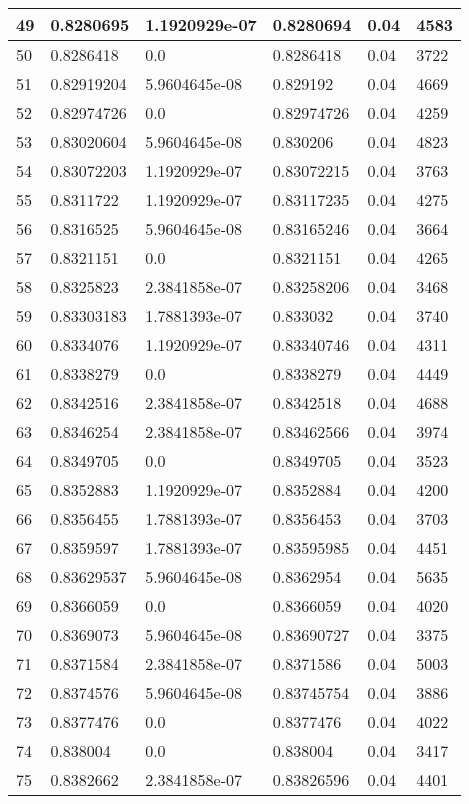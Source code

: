 \begin{longtable}{|l|l|l|l|l|l|}
49 & 0.8280695 & 1.1920929e-07 & 0.8280694 & 0.04 & 4583 \\ \hline 
50 & 0.8286418 & 0.0 & 0.8286418 & 0.04 & 3722 \\ \hline 
51 & 0.82919204 & 5.9604645e-08 & 0.829192 & 0.04 & 4669 \\ \hline 
52 & 0.82974726 & 0.0 & 0.82974726 & 0.04 & 4259 \\ \hline 
53 & 0.83020604 & 5.9604645e-08 & 0.830206 & 0.04 & 4823 \\ \hline 
54 & 0.83072203 & 1.1920929e-07 & 0.83072215 & 0.04 & 3763 \\ \hline 
55 & 0.8311722 & 1.1920929e-07 & 0.83117235 & 0.04 & 4275 \\ \hline 
56 & 0.8316525 & 5.9604645e-08 & 0.83165246 & 0.04 & 3664 \\ \hline 
57 & 0.8321151 & 0.0 & 0.8321151 & 0.04 & 4265 \\ \hline 
58 & 0.8325823 & 2.3841858e-07 & 0.83258206 & 0.04 & 3468 \\ \hline 
59 & 0.83303183 & 1.7881393e-07 & 0.833032 & 0.04 & 3740 \\ \hline 
60 & 0.8334076 & 1.1920929e-07 & 0.83340746 & 0.04 & 4311 \\ \hline 
61 & 0.8338279 & 0.0 & 0.8338279 & 0.04 & 4449 \\ \hline 
62 & 0.8342516 & 2.3841858e-07 & 0.8342518 & 0.04 & 4688 \\ \hline 
63 & 0.8346254 & 2.3841858e-07 & 0.83462566 & 0.04 & 3974 \\ \hline 
64 & 0.8349705 & 0.0 & 0.8349705 & 0.04 & 3523 \\ \hline 
65 & 0.8352883 & 1.1920929e-07 & 0.8352884 & 0.04 & 4200 \\ \hline 
66 & 0.8356455 & 1.7881393e-07 & 0.8356453 & 0.04 & 3703 \\ \hline 
67 & 0.8359597 & 1.7881393e-07 & 0.83595985 & 0.04 & 4451 \\ \hline 
68 & 0.83629537 & 5.9604645e-08 & 0.8362954 & 0.04 & 5635 \\ \hline 
69 & 0.8366059 & 0.0 & 0.8366059 & 0.04 & 4020 \\ \hline 
70 & 0.8369073 & 5.9604645e-08 & 0.83690727 & 0.04 & 3375 \\ \hline 
71 & 0.8371584 & 2.3841858e-07 & 0.8371586 & 0.04 & 5003 \\ \hline 
72 & 0.8374576 & 5.9604645e-08 & 0.83745754 & 0.04 & 3886 \\ \hline 
73 & 0.8377476 & 0.0 & 0.8377476 & 0.04 & 4022 \\ \hline 
74 & 0.838004 & 0.0 & 0.838004 & 0.04 & 3417 \\ \hline 
75 & 0.8382662 & 2.3841858e-07 & 0.83826596 & 0.04 & 4401 \\ \hline 
\end{longtable}